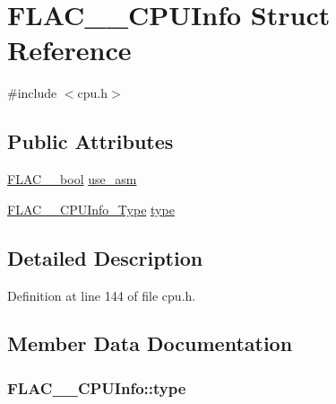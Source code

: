 \hypertarget{struct_f_l_a_c_____c_p_u_info}{}\section{F\+L\+A\+C\+\_\+\+\_\+\+C\+P\+U\+Info Struct Reference}
\label{struct_f_l_a_c_____c_p_u_info}


{\ttfamily \#include $<$cpu.\+h$>$}

\subsection*{Public Attributes}
\begin{DoxyCompactItemize}
\item 
\hyperlink{ordinals_8h_a95103469f1cbd78b8cf250194985b34e}{F\+L\+A\+C\+\_\+\+\_\+bool} \hyperlink{struct_f_l_a_c_____c_p_u_info_aaddf58435509c1c35643b6a8120fde5f}{use\+\_\+asm}
\item 
\hyperlink{libflac_2src_2lib_f_l_a_c_2include_2private_2cpu_8h_ab3e7684a9d63906e1293fe59e24a1d57}{F\+L\+A\+C\+\_\+\+\_\+\+C\+P\+U\+Info\+\_\+\+Type} \hyperlink{struct_f_l_a_c_____c_p_u_info_ad32c529b624b33d0c00386824f57145b}{type}
\end{DoxyCompactItemize}


\subsection{Detailed Description}


Definition at line 144 of file cpu.\+h.



\subsection{Member Data Documentation}
\subsubsection[{\texorpdfstring{type}{type}}]{ F\+L\+A\+C\+\_\+\+\_\+\+C\+P\+U\+Info\+::type}\hypertarget{struct_f_l_a_c_____c_p_u_info_ad32c529b624b33d0c00386824f57145b}{}\label{struct_f_l_a_c_____c_p_u_info_ad32c529b624b33d0c00386824f57145b}


